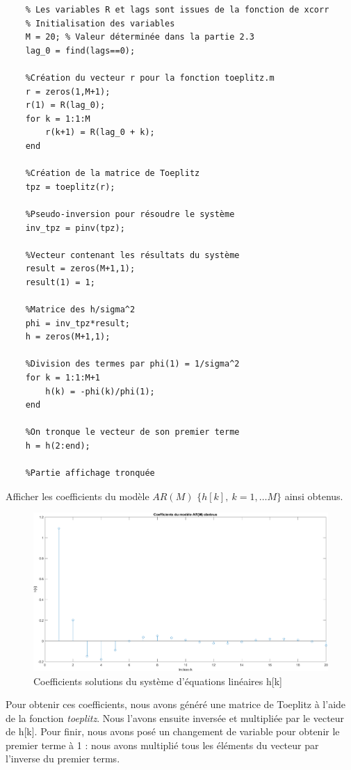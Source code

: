 \documentclass{article}
\begin{document}
\begin{verbatim}
    % Les variables R et lags sont issues de la fonction de xcorr
    % Initialisation des variables
    M = 20; % Valeur déterminée dans la partie 2.3
    lag_0 = find(lags==0);
    
    %Création du vecteur r pour la fonction toeplitz.m
    r = zeros(1,M+1);
    r(1) = R(lag_0);
    for k = 1:1:M
        r(k+1) = R(lag_0 + k);
    end
    
    %Création de la matrice de Toeplitz
    tpz = toeplitz(r);
    
    %Pseudo-inversion pour résoudre le système 
    inv_tpz = pinv(tpz);
    
    %Vecteur contenant les résultats du système
    result = zeros(M+1,1);
    result(1) = 1;
    
    %Matrice des h/sigma^2
    phi = inv_tpz*result;
    h = zeros(M+1,1);
    
    %Division des termes par phi(1) = 1/sigma^2
    for k = 1:1:M+1
        h(k) = -phi(k)/phi(1);
    end
    
    %On tronque le vecteur de son premier terme
    h = h(2:end);    
    
    %Partie affichage tronquée
\end{verbatim}

\clearpage
Afficher les coefficients  du modèle $AR(M)$ $\{h[k],~k=1,\ldots M\}$ ainsi obtenus.

\begin{figure}[!h]
    \centering
    \includegraphics[width=1\textwidth]{images/hk_solution.png}
    \caption{Coefficients solutions du système d'équations linéaires h[k]}
    \label{fig-binaire}
\end{figure}
Pour obtenir ces coefficients, nous avons généré une matrice de Toeplitz à l'aide de la fonction \textit{toeplitz}. Nous l'avons ensuite inversée et multipliée par le vecteur de h[k]. Pour finir, nous avons posé un changement de variable pour obtenir le premier terme à 1 : nous avons multiplié tous les éléments du vecteur par l'inverse du premier terms.
\clearpage
\end{document}
